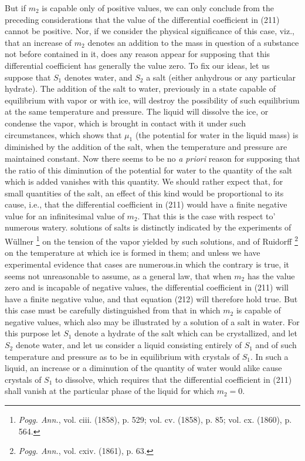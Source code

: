 \documentclass[12pt]{article}
\begin{document}
But if $m_2$ is capable only of positive values, we can only conclude from the preceding considerations that the value of the differential coefficient in (211) cannot be positive. Nor, if we consider the physical significance of this case, viz., that an increase of $m_2$ denotes an addition to the mass in question of a substance not before contained in it, does any reason appear for supposing that this differential coefficient has generally the value zero. To fix our ideas, let us suppose that $S_1$ denotes water, and $S_2$ a salt (either anhydrous or any particular hydrate). The addition of the salt to water, previously in a state capable of equilibrium with vapor or with ice, will destroy the possibility of such equilibrium at the same temperature and pressure. The liquid will dissolve the ice, or condense the vapor, which is brought in contact with it under such circumstances, which shows that $\mu_1$ (the potential for water in the liquid mass) is diminished by the addition of the salt, when the temperature and pressure are maintained constant. Now there seems to be no \textit{a priori} reason for supposing that the ratio of this diminution of the potential for water to the quantity of the salt which is added vanishes with this quantity. We should rather expect that, for small quantities of the salt, an effect of this kind would be proportional to its cause, i.e., that the differential coefficient in (211) would have a finite negative value for an infinitesimal value of
$m_2$. That this is the case with respect to' numerous watery. solutions of salts is distinctly indicated by the experiments of Wüllner \footnote{\textit{Pogg. Ann.}, vol. ciii. (1858), p. 529; vol. cv. (1858), p. 85; vol. cx. (1860), p. 564.} on the tension of the vapor yielded by such solutions, and of Ruidorff \footnote{\textit{Pogg. Ann.}, vol. cxiv. (1861), p. 63.} on the temperature at which ice is formed in them; and unless we have experimental evidence that cases are numerous.in which the contrary is true, it seems not unreasonable to assume, as a general law, that when $m_2$ has the value zero and is incapable of negative values, the differential coefficient in (211) will have a finite negative value, and that equation (212) will therefore hold true. But this case must be carefully distinguished from that in which $m_2$ is capable of negative values, which also may be illustrated by a solution of a salt in water. For this purpose let $S_1$ denote a hydrate of the salt which can be crystallized, and let $S_2$ denote water, and let us consider a liquid consisting entirely of $S_1$ and of such temperature and pressure as to be in equilibrium with crystals of $S_1$. In such a liquid, an increase or a diminution of the quantity of water would alike cause crystals of $S_1$ to dissolve, which requires that the differential coefficient in (211) shall vanish at the particular phase of the liquid for which $m_2 = 0$.
\end{document}
